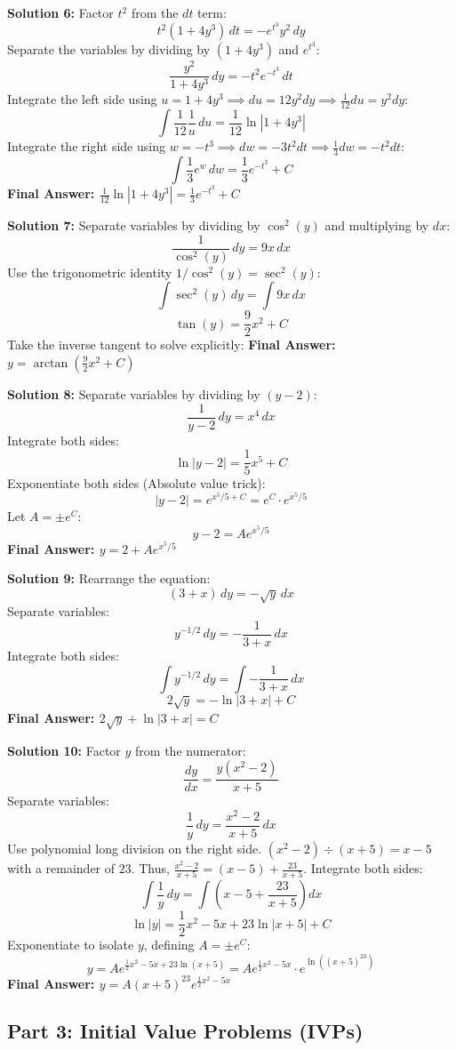 \documentclass[11pt]{article}
\begin{document}
\textbf{Solution 6:}
Factor $t^2$ from the $dt$ term:
\[ t^2(1 + 4y^3) \, dt = -e^{t^3} y^2 \, dy \]
Separate the variables by dividing by $(1+4y^3)$ and $e^{t^3}$:
\[ \frac{y^2}{1+4y^3} \, dy = -t^2 e^{-t^3} \, dt \]
Integrate the left side using $u = 1+4y^3 \implies du = 12y^2 dy \implies \frac{1}{12}du = y^2 dy$:
\[ \int \frac{1}{12} \frac{1}{u} \, du = \frac{1}{12}\ln|1+4y^3| \]
Integrate the right side using $w = -t^3 \implies dw = -3t^2 dt \implies \frac{1}{3}dw = -t^2 dt$:
\[ \int \frac{1}{3} e^w \, dw = \frac{1}{3}e^{-t^3} + C \]
\textbf{Final Answer: $\frac{1}{12}\ln|1+4y^3| = \frac{1}{3}e^{-t^3} + C$}

\textbf{Solution 7:}
Separate variables by dividing by $\cos^2(y)$ and multiplying by $dx$:
\[ \frac{1}{\cos^2(y)} \, dy = 9x \, dx \]
Use the trigonometric identity $1/\cos^2(y) = \sec^2(y)$:
\[ \int \sec^2(y) \, dy = \int 9x \, dx \]
\[ \tan(y) = \frac{9}{2}x^2 + C \]
Take the inverse tangent to solve explicitly:
\textbf{Final Answer: $y = \arctan\left(\frac{9}{2}x^2 + C\right)$}

\textbf{Solution 8:}
Separate variables by dividing by $(y-2)$:
\[ \frac{1}{y-2} \, dy = x^4 \, dx \]
Integrate both sides:
\[ \ln|y-2| = \frac{1}{5}x^5 + C \]
Exponentiate both sides (Absolute value trick):
\[ |y-2| = e^{x^5/5 + C} = e^C \cdot e^{x^5/5} \]
Let $A = \pm e^C$:
\[ y - 2 = A e^{x^5/5} \]
\textbf{Final Answer: $y = 2 + A e^{x^5/5}$}

\textbf{Solution 9:}
Rearrange the equation:
\[ (3+x) \, dy = -\sqrt{y} \, dx \]
Separate variables:
\[ y^{-1/2} \, dy = -\frac{1}{3+x} \, dx \]
Integrate both sides:
\[ \int y^{-1/2} \, dy = \int -\frac{1}{3+x} \, dx \]
\[ 2\sqrt{y} = -\ln|3+x| + C \]
\textbf{Final Answer: $2\sqrt{y} + \ln|3+x| = C$}

\textbf{Solution 10:}
Factor $y$ from the numerator:
\[ \frac{dy}{dx} = \frac{y(x^2 - 2)}{x+5} \]
Separate variables:
\[ \frac{1}{y} \, dy = \frac{x^2 - 2}{x+5} \, dx \]
Use polynomial long division on the right side. $(x^2 - 2) \div (x+5) = x - 5$ with a remainder of $23$. Thus, $\frac{x^2-2}{x+5} = (x - 5) + \frac{23}{x+5}$.
Integrate both sides:
\[ \int \frac{1}{y} \, dy = \int \left( x - 5 + \frac{23}{x+5} \right) dx \]
\[ \ln|y| = \frac{1}{2}x^2 - 5x + 23\ln|x+5| + C \]
Exponentiate to isolate $y$, defining $A = \pm e^C$:
\[ y = A e^{\frac{1}{2}x^2 - 5x + 23\ln(x+5)} = A e^{\frac{1}{2}x^2 - 5x} \cdot e^{\ln((x+5)^{23})} \]
\textbf{Final Answer: $y = A (x+5)^{23} e^{\frac{1}{2}x^2 - 5x}$}

\subsection*{Part 3: Initial Value Problems (IVPs)}
\end{document}
